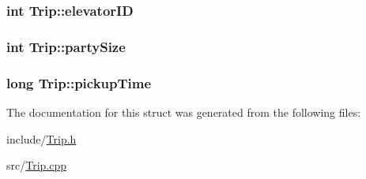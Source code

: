 \subsubsection[{elevator\+I\+D}]{\setlength{\rightskip}{0pt plus 5cm}int Trip\+::elevator\+I\+D}\label{struct_trip_a734134f36b0e7d28e79ed51209033505}
\hypertarget{struct_trip_aa8fbdf14714f874eeab3b8b56681840a}{}
\subsubsection[{party\+Size}]{\setlength{\rightskip}{0pt plus 5cm}int Trip\+::party\+Size}\label{struct_trip_aa8fbdf14714f874eeab3b8b56681840a}
\hypertarget{struct_trip_a9cb92b360488aee5194aa781beac880d}{}
\subsubsection[{pickup\+Time}]{\setlength{\rightskip}{0pt plus 5cm}long Trip\+::pickup\+Time}\label{struct_trip_a9cb92b360488aee5194aa781beac880d}


The documentation for this struct was generated from the following files\+:\begin{DoxyCompactItemize}
\item 
include/\hyperlink{_trip_8h}{Trip.\+h}\item 
src/\hyperlink{_trip_8cpp}{Trip.\+cpp}\end{DoxyCompactItemize}
